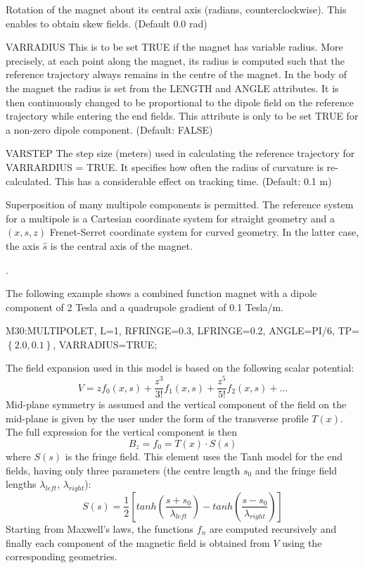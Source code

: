 \begin{kdescription}
  Rotation of the magnet about its central axis (radians, counterclockwise). This enables to obtain skew fields. (Default 0.0 rad)  
  \item[VARRADIUS]
  This is to be set TRUE if the magnet has variable radius. More precisely, at each point along the magnet, its radius is computed such that the reference trajectory always remains in the centre of the magnet. In the body of the magnet the radius is set from the LENGTH and ANGLE attributes. It is then continuously changed to be proportional to the dipole field on the reference trajectory while entering the end fields. This attribute is only to be set TRUE for a non-zero dipole component. (Default: FALSE) 
\item[VARSTEP]
  The step size (meters) used in calculating the reference trajectory for VARRARDIUS = TRUE. It specifies how often the radius of curvature is re-calculated. This has a considerable effect on tracking time. (Default: 0.1 m)
\end{kdescription}

Superposition of many multipole components is permitted.
The reference system for a multipole is a Cartesian coordinate system for straight
geometry and a $(x,s,z)$ Frenet-Serret coordinate system for curved geometry. In the latter case, the axis $\hat{s}$ is the central axis of the magnet. 

 
.

\noindent The following example shows a combined function magnet with a dipole component
of 2 Tesla and a quadrupole gradient of 0.1 Tesla/m.
\begin{example}
M30:MULTIPOLET, L=1, RFRINGE=0.3, LFRINGE=0.2, ANGLE=PI/6, TP=$\left\{ 2.0, 0.1 \right\}$, VARRADIUS=TRUE;
\end{example}

The field expansion used in this model is based on the following scalar potential:
\begin{equation}
 V = z f_0(x,s) + \frac{z^3}{3!} f_1(x,s) + \frac{z^5}{5!} f_2(x,s) + \dots 
\end{equation}
Mid-plane symmetry is assumed and the vertical component of the field on the mid-plane is given by the user under the form of the transverse profile $T(x)$. The full expression for the vertical component is then 
\begin{equation}
B_z = f_0 = T(x) \cdot S(s)
\end{equation} 
where $S(s)$ is the fringe field. This element uses the Tanh model for the end fields, having only three parameters (the centre length $s_0$ and the fringe field lengths $\lambda_{left}$, $\lambda_{right}$):
\begin{equation}
 S(s) = \frac{1}{2} \left[ tanh \left( \frac{s + s_0}{\lambda_{left}} \right) - 
 tanh \left( \frac{s - s_0}{\lambda_{right}} \right) \right]
\end{equation}
Starting from Maxwell's laws, the functions $f_n$ are computed recursively and finally each component of the magnetic field is obtained from $V$ using the corresponding geometries.


